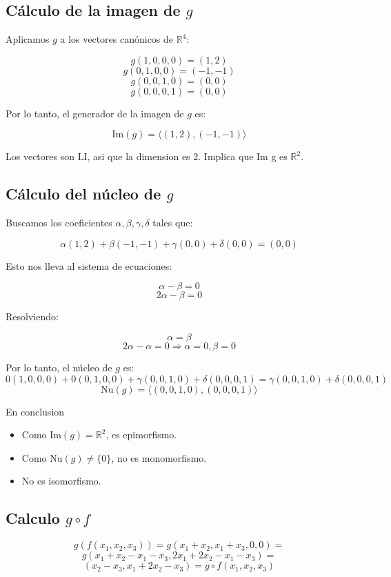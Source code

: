 \subsection*{Cálculo de la imagen de \( g \)}

Aplicamos \( g \) a los vectores canónicos de \( \mathbb{R}^4 \):

\[ g(1,0,0,0) = (1,2) \]
\[ g(0,1,0,0) = (-1,-1) \]
\[ g(0,0,1,0) = (0,0) \]
\[ g(0,0,0,1) = (0,0) \]

Por lo tanto, el generador de la imagen de \( g \) es:

\[ \text{Im}(g) = \langle (1,2), (-1,-1) \rangle \]

Los vectores son LI, asi que la dimension es 2. Implica que Im g es \( \mathbb{R}^2 \).

\subsection*{Cálculo del núcleo de \( g \)}

Buscamos los coeficientes \( \alpha, \beta, \gamma, \delta \) tales que:

\[ \alpha(1,2) + \beta(-1,-1) + \gamma(0,0) + \delta(0,0) = (0,0) \]

Esto nos lleva al sistema de ecuaciones:

\[ \alpha - \beta = 0 \]
\[ 2\alpha - \beta = 0 \]

Resolviendo:

\[ \alpha = \beta \]
\[ 2\alpha - \alpha = 0 \Rightarrow \alpha = 0, \beta = 0 \]

Por lo tanto, el núcleo de \( g \) es:
\[ 0(1,0,0,0) + 0(0,1,0,0) + \gamma(0,0,1,0) + \delta(0,0,0,1) = \gamma(0,0,1,0) + \delta(0,0,0,1) \]
\[ \text{Nu}(g) = \langle (0,0,1,0), (0,0,0,1) \rangle \]

En conclusion

\begin{itemize}
  \item Como \( \text{Im}(g) = \mathbb{R}^2 \), es epimorfismo.
  \item Como \( \text{Nu}(g) \neq \{0\} \), no es monomorfismo.
  \item No es isomorfismo.
\end{itemize}

\subsection*{Calculo \( g\circ f \)}
\[ g(f(x_1,x_2,x_3)) = g(x_1+x_2,x_1+x_3,0,0) =\]
\[ g(x_1+x_2-x_1-x_3,2x_1+2x_2-x_1-x_3) =   \]
\[ (x_2-x_3,x_1+2x_2-x_3) = g\circ f (x_1,x_2,x_3) \]

